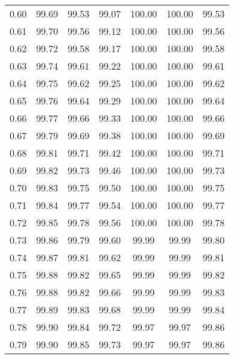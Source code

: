 \begin{tabular}{|c|c|c|c|c|c|c|}
      0.60 &     99.69 &     99.53 &      99.07 &  100.00 &     100.00 &         99.53 \\
      0.61 &     99.70 &     99.56 &      99.12 &  100.00 &     100.00 &         99.56 \\
      0.62 &     99.72 &     99.58 &      99.17 &  100.00 &     100.00 &         99.58 \\
      0.63 &     99.74 &     99.61 &      99.22 &  100.00 &     100.00 &         99.61 \\
      0.64 &     99.75 &     99.62 &      99.25 &  100.00 &     100.00 &         99.62 \\
      0.65 &     99.76 &     99.64 &      99.29 &  100.00 &     100.00 &         99.64 \\
      0.66 &     99.77 &     99.66 &      99.33 &  100.00 &     100.00 &         99.66 \\
      0.67 &     99.79 &     99.69 &      99.38 &  100.00 &     100.00 &         99.69 \\
      0.68 &     99.81 &     99.71 &      99.42 &  100.00 &     100.00 &         99.71 \\
      0.69 &     99.82 &     99.73 &      99.46 &  100.00 &     100.00 &         99.73 \\
      0.70 &     99.83 &     99.75 &      99.50 &  100.00 &     100.00 &         99.75 \\
      0.71 &     99.84 &     99.77 &      99.54 &  100.00 &     100.00 &         99.77 \\
      0.72 &     99.85 &     99.78 &      99.56 &  100.00 &     100.00 &         99.78 \\
      0.73 &     99.86 &     99.79 &      99.60 &   99.99 &      99.99 &         99.80 \\
      0.74 &     99.87 &     99.81 &      99.62 &   99.99 &      99.99 &         99.81 \\
      0.75 &     99.88 &     99.82 &      99.65 &   99.99 &      99.99 &         99.82 \\
      0.76 &     99.88 &     99.82 &      99.66 &   99.99 &      99.99 &         99.83 \\
      0.77 &     99.89 &     99.83 &      99.68 &   99.99 &      99.99 &         99.84 \\
      0.78 &     99.90 &     99.84 &      99.72 &   99.97 &      99.97 &         99.86 \\
      0.79 &     99.90 &     99.85 &      99.73 &   99.97 &      99.97 &         99.86 \\

\end{tabular}
